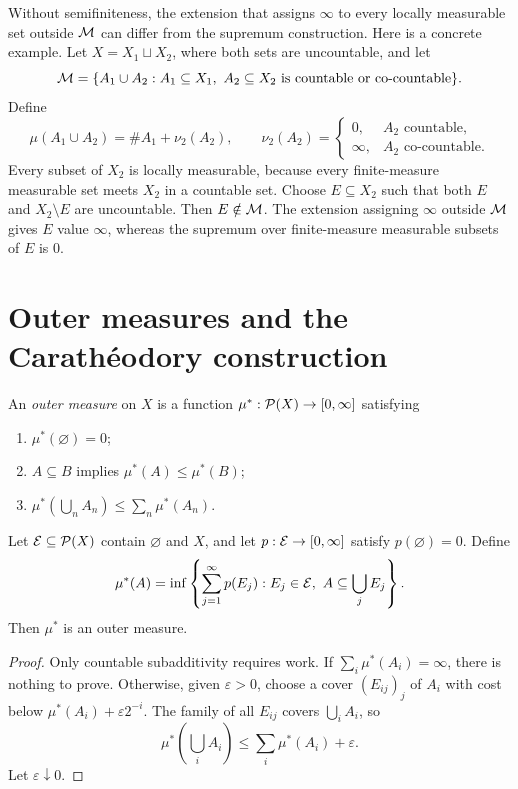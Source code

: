 \begin{remark}
Without semifiniteness, the extension that assigns $\infty$ to every locally measurable set outside $\mathcal{M}$ can differ from the supremum construction. Here is a concrete example. Let $X=X_1\sqcup X_2$, where both sets are uncountable, and let
\[
\mathcal{M}=\{A_1\cup A_2:A_1\subseteq X_1,\ A_2\subseteq X_2
       \text{ is countable or co-countable}\}.
\]
Define
\[
\mu(A_1\cup A_2)=\#A_1+\nu_2(A_2),
\qquad
\nu_2(A_2)=
\begin{cases}
0,&A_2\text{ countable},\\
\infty,&A_2\text{ co-countable}.
\end{cases}
\]
Every subset of $X_2$ is locally measurable, because every finite-measure measurable set meets $X_2$ in a countable set. Choose $E\subseteq X_2$ such that both $E$ and $X_2\setminus E$ are uncountable. Then $E\notin\mathcal{M}$. The extension assigning $\infty$ outside $\mathcal{M}$ gives $E$ value $\infty$, whereas the supremum over finite-measure measurable subsets of $E$ is $0$.
\end{remark}

\section{Outer measures and the Carath\'eodory construction}

\begin{de}
An \emph{outer measure} on $X$ is a function $\mu^*:\mathcal{P}(X)\to[0,\infty]$ satisfying
\begin{enumerate}
  \item $\mu^*(\varnothing)=0$;
  \item $A\subseteq B$ implies $\mu^*(A)\leq\mu^*(B)$;
  \item $\mu^*(\bigcup_nA_n)\leq\sum_n\mu^*(A_n)$.
\end{enumerate}
\end{de}

\begin{prop}
Let $\mathcal{E}\subseteq\mathcal{P}(X)$ contain $\varnothing$ and $X$, and let $p:\mathcal{E}\to[0,\infty]$ satisfy $p(\varnothing)=0$. Define
\[
\mu^*(A)=\inf\left\{\sum_{j=1}^{\infty}p(E_j):
 E_j\in\mathcal{E},\ A\subseteq\bigcup_jE_j\right\}.
\]
Then $\mu^*$ is an outer measure.
\end{prop}

\begin{proof}
Only countable subadditivity requires work. If $\sum_i\mu^*(A_i)=\infty$, there is nothing to prove. Otherwise, given $\varepsilon>0$, choose a cover $(E_{ij})_j$ of $A_i$ with cost below $\mu^*(A_i)+\varepsilon2^{-i}$. The family of all $E_{ij}$ covers $\bigcup_iA_i$, so
\[
\mu^*\left(\bigcup_iA_i\right)
 \leq\sum_i\mu^*(A_i)+\varepsilon.
\]
Let $\varepsilon\downarrow0$.
\end{proof}

